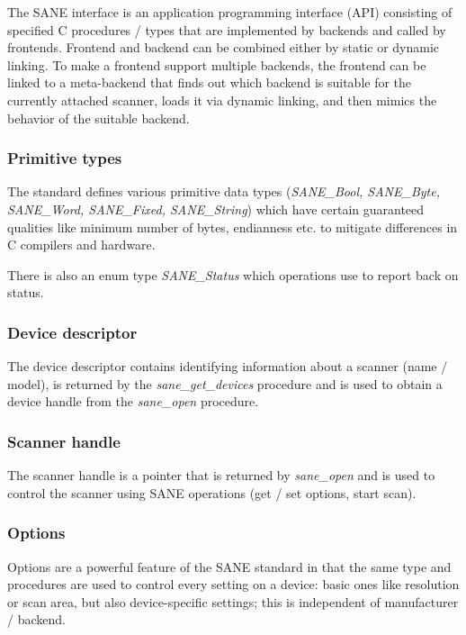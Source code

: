 \documentclass{article}
\begin{document}
The SANE interface is an application programming interface (API) consisting
of specified C procedures / types that are implemented by backends and called by frontends.
Frontend and backend can be combined either by static or dynamic linking.
To make a frontend support multiple backends, the frontend can be linked to a
meta-backend that finds out which backend is suitable for the currently attached
scanner, loads it via dynamic linking, and then mimics the behavior
of the suitable backend. \cite[3.1]{sane_standard}

\subsubsection{Primitive types}

The standard defines various primitive data types
({\it SANE\_Bool, SANE\_Byte, SANE\_Word, SANE\_Fixed, SANE\_String})
which have certain guaranteed qualities
like minimum number of bytes, endianness etc. to mitigate differences in
C compilers and hardware.

There is also an enum type {\it SANE\_Status} which operations use to report back on
status.

\subsubsection{Device descriptor}

The device descriptor contains identifying information about a scanner (name / model),
is returned by the {\it sane\_get\_devices} procedure and is used to obtain a device handle
from the {\it sane\_open} procedure.

\subsubsection{Scanner handle}

The scanner handle is a pointer that is returned by {\it sane\_open} and is used to
control the scanner using SANE operations (get / set options, start scan).

\subsubsection{Options}

Options are a powerful feature of the SANE standard in that the same type and procedures
are used to control every setting on a device: basic ones like resolution or scan area, but also
device-specific settings; this is independent of manufacturer / backend.
\end{document}

